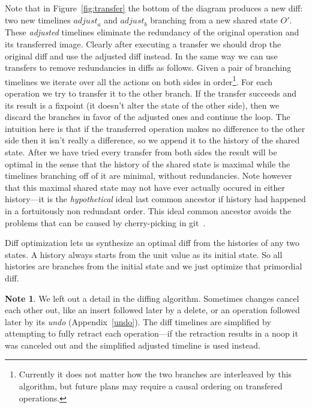 \documentclass[english,submission]{programming}
\theoremstyle{definition}
\newtheorem*{note}{Note}
\begin{document}
Note that in Figure~\ref{fig:transfer} the bottom of the diagram produces a new diff: two new timelines $\mathit{adjust}_a$ and $\mathit{adjust}_b$ branching from a new shared state $O'$. These \textit{adjusted} timelines eliminate the redundancy of the original operation and its transferred image. Clearly after executing a transfer we should drop the original diff and use the adjusted diff instead. In the same way we can use transfers to remove redundancies in diffs as follows. Given a pair of branching timelines we iterate over all the actions on both sides in order\footnote{Currently it does not matter how the two branches are interleaved by this algorithm, but future plans may require a causal ordering on transfered operations.}. For each operation we try to transfer it to the other branch. If the transfer succeeds and its result is a fixpoint (it doesn't alter the state of the other side), then we discard the branches in favor of the adjusted ones and continue the loop. The intuition here is that if the transferred operation makes no difference to the other side then it isn't really a difference, so we append it to the history of the shared state. After we have tried every transfer from both sides the result will be optimal in the sense that the history of the shared state is maximal while the timelines branching off of it are minimal, without redundancies. Note however that this maximal shared state may not have ever actually occured in either history---it is the \textit{hypothetical} ideal last common ancestor if history had happened in a fortuitously non redundant order. This ideal common ancestor avoids the problems that can be caused by cherry-picking in git~\cite{philomatics-git}.

Diff optimization lets us synthesize an optimal diff from the histories of any two states. A history always starts from the unit value as its initial state. So all histories are branches from the initial state and we just optimize that primordial diff.

\begin{note}
  We left out a detail in the diffing algorithm. Sometimes changes cancel each other out, like an insert followed later by a delete, or an operation followed later by its \textit{undo} (Appendix~\ref{undo}). The diff timelines are simplified by attempting to fully retract each operation---if the retraction results in a \textsf{noop} it was canceled out and the simplified adjusted timeline is used instead.
\end{note}
\end{document}
